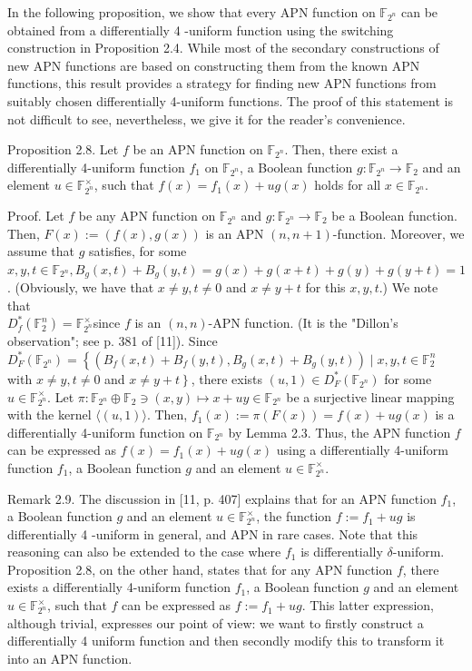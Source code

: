 \documentclass[10pt]{article}
\begin{document}
In the following proposition, we show that every APN function on $\mathbb{F}_{2^{n}}$ can be obtained from a differentially 4 -uniform function using the switching construction in Proposition 2.4. While most of the secondary constructions of new APN functions are based on constructing them from the known APN functions, this result provides a strategy for finding new APN functions from suitably chosen differentially 4-uniform functions. The proof of this statement is not difficult to see, nevertheless, we give it for the reader's convenience.

Proposition 2.8. Let $f$ be an APN function on $\mathbb{F}_{2^{n}}$. Then, there exist a differentially 4-uniform function $f_{1}$ on $\mathbb{F}_{2^{n}}$, a Boolean function $g: \mathbb{F}_{2^{n}} \rightarrow \mathbb{F}_{2}$ and an element $u \in \mathbb{F}_{2^{n}}^{\times}$, such that $f(x)=f_{1}(x)+u g(x)$ holds for all $x \in \mathbb{F}_{2^{n}}$.

Proof. Let $f$ be any APN function on $\mathbb{F}_{2^{n}}$ and $g: \mathbb{F}_{2^{n}} \rightarrow \mathbb{F}_{2}$ be a Boolean function. Then, $F(x):=(f(x), g(x))$ is an APN $(n, n+1)$-function. Moreover, we assume that $g$ satisfies, for some $x, y, t \in \mathbb{F}_{2^{n}}, B_{g}(x, t)+B_{g}(y, t)=g(x)+g(x+t)+g(y)+g(y+t)=1$. (Obviously, we have that $x \neq y, t \neq 0$ and $x \neq y+t$ for this $x, y, t$.) We note that\\
$D_{f}^{*}\left(\mathbb{F}_{2}^{n}\right)=\mathbb{F}_{2^{n}}^{\times}$since $f$ is an $(n, n)$-APN function. (It is the "Dillon's observation"; see p. 381 of [11]). Since $D_{F}^{*}\left(\mathbb{F}_{2^{n}}\right)=\left\{\left(B_{f}(x, t)+B_{f}(y, t), B_{g}(x, t)+B_{g}(y, t)\right) \mid x, y, t \in\right. \mathbb{F}_{2}^{n}$ with $x \neq y, t \neq 0$ and $\left.x \neq y+t\right\}$, there exists $(u, 1) \in D_{F}^{*}\left(\mathbb{F}_{2^{n}}\right)$ for some $u \in \mathbb{F}_{2^{n}}^{\times}$. Let $\pi: \mathbb{F}_{2^{n}} \oplus \mathbb{F}_{2} \ni(x, y) \mapsto x+u y \in \mathbb{F}_{2^{n}}$ be a surjective linear mapping with the kernel $\langle(u, 1)\rangle$. Then, $f_{1}(x):=\pi(F(x))=f(x)+u g(x)$ is a differentially 4-uniform function on $\mathbb{F}_{2^{n}}$ by Lemma 2.3. Thus, the APN function $f$ can be expressed as $f(x)=f_{1}(x)+u g(x)$ using a differentially 4-uniform function $f_{1}$, a Boolean function $g$ and an element $u \in \mathbb{F}_{2^{n}}^{\times}$.

Remark 2.9. The discussion in [11, p. 407] explains that for an APN function $f_{1}$, a Boolean function $g$ and an element $u \in \mathbb{F}_{2^{n}}^{\times}$, the function $f:=f_{1}+u g$ is differentially 4 -uniform in general, and APN in rare cases. Note that this reasoning can also be extended to the case where $f_{1}$ is differentially $\delta$-uniform. Proposition 2.8, on the other hand, states that for any APN function $f$, there exists a differentially 4-uniform function $f_{1}$, a Boolean function $g$ and an element $u \in \mathbb{F}_{2^{n}}^{\times}$, such that $f$ can be expressed as $f:=f_{1}+u g$. This latter expression, although trivial, expresses our point of view: we want to firstly construct a differentially 4 uniform function and then secondly modify this to transform it into an APN function.
\end{document}
